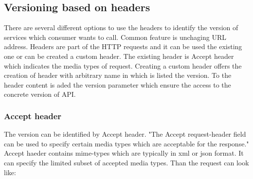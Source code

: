 



\subsection{Versioning based on headers}

There are several different options to use the headers to identify the version of services which consumer wants to call. Common feature is unchaging URL address. Headers are part of the HTTP requests and it can be used the existing one or can be created a custom header. The existing header is Accept header which indicates the media types of request. Creating a custom header offers the creation of header with arbitrary name in which is listed the version. To the header content is aded the version parameter which ensure the access to the concrete version of API.

\subsubsection{Accept header}
The version can be identified by Accept header. "The Accept request-header field can be used to specify certain media types which are acceptable for the response." \cite{website:w3} Accept haeder contains \gls{mime-types} which are typically in \gls{xml} or \gls{json} format. It can specify the limited subset of accepted media types. Than the request can look like:

